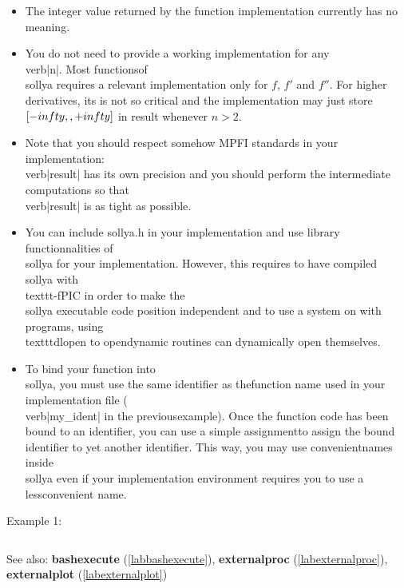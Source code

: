 \begin{itemize}
\item The integer value returned by the function implementation currently has no meaning.\n
\item You do not need to provide a working implementation for any \\verb|n|. Most functions\n   of \\sollya requires a relevant implementation only for $f$, $f'$ and $f''$. For higher \n   derivatives, its is not so critical and the implementation may just store \n   $[-\\infty,\\,+\\infty]$ in result whenever $n>2$.\n
\item Note that you should respect somehow MPFI standards in your implementation:\n   \\verb|result| has its own precision and you should perform the \n   intermediate computations so that \\verb|result| is as tight as possible.\n
\item You can include sollya.h in your implementation and use library \n   functionnalities of \\sollya for your implementation. However, this requires to have compiled\n   \\sollya with \\texttt{-fPIC} in order to make the \\sollya executable code position \n   independent and to use a system on with programs, using \\texttt{dlopen} to open\n   dynamic routines can dynamically open themselves.\n
\item To bind your function into \\sollya, you must use the same identifier as the\n   function name used in your implementation file (\\verb|my_ident| in the previous\n   example). Once the function code has been bound to an identifier, you can use a simple assignment\n   to assign the bound identifier to yet another identifier. This way, you may use convenient\n   names inside \\sollya even if your implementation environment requires you to use a less\n   convenient name.\n\end{itemize}
\noindent Example 1: 
\begin{center}\begin{minipage}{15cm}\begin{Verbatim}[frame=single]
\end{Verbatim}
\end{minipage}\end{center}
See also: \textbf{bashexecute} (\ref{labbashexecute}), \textbf{externalproc} (\ref{labexternalproc}), \textbf{externalplot} (\ref{labexternalplot})
